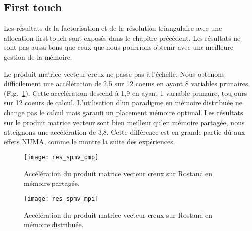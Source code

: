 \subsection{First touch}
Les résultats de la factorisation et de la résolution triangulaire avec une allocation first touch sont exposés dans le chapitre précèdent.
%
Les résultats ne sont pas aussi bons que ceux que nous pourrions obtenir avec une meilleure gestion de la mémoire.


Le produit matrice vecteur creux ne passe pas à l'échelle.
%
Nous obtenons difficilement une accélération de 2,5 sur 12 coeurs en ayant 8 variables primaires (Fig.~\ref{fig:res_spmv_omp_rostand}).
%
Cette accélération descend à 1,9 en ayant 1 variable primaire, toujours sur 12 coeurs de calcul.
%
L'utilisation d'un paradigme en mémoire distribuée ne change pas le calcul mais garanti un placement mémoire optimal.
%
Les résultats sur le produit matrice vecteur sont bien meilleur qu'en mémoire partagée, nous atteignons une accélération de 3,8.
%
Cette différence est en grande partie dû aux effets NUMA, comme le montre la suite des expériences.


\begin{figure}[t!]
  \centering
  \texttt{[image: res\_spmv\_omp]}
  \caption{Accélération du produit matrice vecteur creux sur Rostand en mémoire partagée.}
  \label{fig:res_spmv_omp_rostand}
\end{figure}

\begin{figure}[t!]
  \centering
  \texttt{[image: res\_spmv\_mpi]}
  \caption{Accélération du produit matrice vecteur creux sur Rostand en mémoire distribuée.}
  \label{fig:res_spmv_mpi_rostand}
\end{figure}

